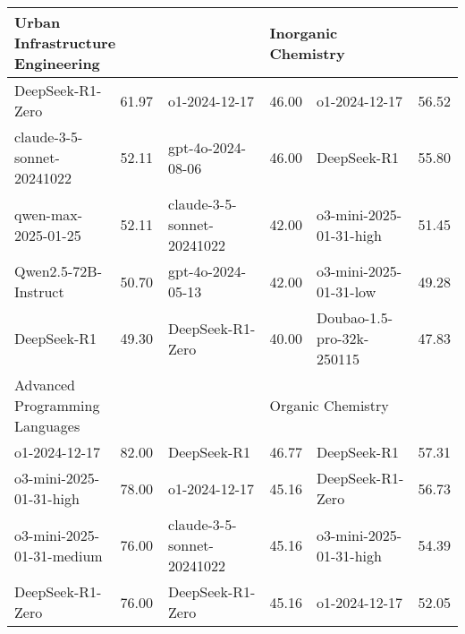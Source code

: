 {\begin{longtable}{p{4.2cm}>{\centering\arraybackslash} p{0.8cm}|p{4.2cm} >{\centering\arraybackslash} p{0.8cm}|p{4.2cm} >{\centering\arraybackslash} p{0.8cm}}
\hline
\multicolumn{2}{p{5.15cm}|}{\cellcolor{blue!10} \centering Urban Infrastructure Engineering} & \multicolumn{2}{p{5.15cm}|}{\cellcolor{purple!10} \centering Dance Studies} & \multicolumn{2}{p{5.15cm}}{\cellcolor{green!10} \centering Inorganic Chemistry}\\
\hline
\cellcolor{blue!5} DeepSeek-R1-Zero & \cellcolor{blue!2}61.97 & \cellcolor{purple!5} o1-2024-12-17 & \cellcolor{purple!2} 46.00 & \cellcolor{green!5} o1-2024-12-17 & \cellcolor{green!2} 56.52\\
\cellcolor{blue!5} claude-3-5-sonnet-20241022 & \cellcolor{blue!2}52.11 & \cellcolor{purple!5} gpt-4o-2024-08-06 & \cellcolor{purple!2} 46.00 & \cellcolor{green!5} DeepSeek-R1 & \cellcolor{green!2} 55.80\\
\cellcolor{blue!5} qwen-max-2025-01-25 & \cellcolor{blue!2}52.11 & \cellcolor{purple!5} claude-3-5-sonnet-20241022 & \cellcolor{purple!2} 42.00 & \cellcolor{green!5} o3-mini-2025-01-31-high & \cellcolor{green!2} 51.45\\
\cellcolor{blue!5} Qwen2.5-72B-Instruct & \cellcolor{blue!2}50.70 & \cellcolor{purple!5} gpt-4o-2024-05-13 & \cellcolor{purple!2} 42.00 & \cellcolor{green!5} o3-mini-2025-01-31-low & \cellcolor{green!2} 49.28\\
\cellcolor{blue!5} DeepSeek-R1 & \cellcolor{blue!2}49.30 & \cellcolor{purple!5} DeepSeek-R1-Zero & \cellcolor{purple!2} 40.00 & \cellcolor{green!5} Doubao-1.5-pro-32k-250115 & \cellcolor{green!2} 47.83\\
\hline
\multicolumn{2}{p{5.15cm}|}{\cellcolor{blue!10} \centering Advanced Programming Languages} & \multicolumn{2}{p{5.15cm}|}{\cellcolor{purple!10} \centering Design Arts} & \multicolumn{2}{p{5.15cm}}{\cellcolor{green!10} \centering Organic Chemistry}\\
\hline
\cellcolor{blue!5} o1-2024-12-17 & \cellcolor{blue!2}82.00 & \cellcolor{purple!5} DeepSeek-R1 & \cellcolor{purple!2} 46.77 & \cellcolor{green!5} DeepSeek-R1 & \cellcolor{green!2} 57.31\\
\cellcolor{blue!5} o3-mini-2025-01-31-high & \cellcolor{blue!2}78.00 & \cellcolor{purple!5} o1-2024-12-17 & \cellcolor{purple!2} 45.16 & \cellcolor{green!5} DeepSeek-R1-Zero & \cellcolor{green!2} 56.73\\
\cellcolor{blue!5} o3-mini-2025-01-31-medium & \cellcolor{blue!2}76.00 & \cellcolor{purple!5} claude-3-5-sonnet-20241022 & \cellcolor{purple!2} 45.16 & \cellcolor{green!5} o3-mini-2025-01-31-high & \cellcolor{green!2} 54.39\\
\cellcolor{blue!5} DeepSeek-R1-Zero & \cellcolor{blue!2}76.00 & \cellcolor{purple!5} DeepSeek-R1-Zero & \cellcolor{purple!2} 45.16 & \cellcolor{green!5} o1-2024-12-17 & \cellcolor{green!2} 52.05\\

\end{longtable}}
